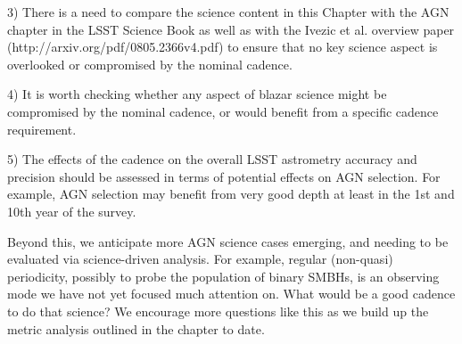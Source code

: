 3) There is a need to compare the science content in this Chapter
with the AGN chapter in the LSST Science Book as well as with the
Ivezic et al. overview paper (http://arxiv.org/pdf/0805.2366v4.pdf)
to ensure that no key science aspect is overlooked or compromised
by the nominal cadence.






4) It is worth checking whether
any aspect of blazar science might be compromised by the nominal cadence, or
would benefit from a specific cadence requirement.

5) The effects of the cadence on the overall LSST astrometry accuracy and precision
should be assessed in terms of potential effects on AGN selection. For example,
AGN selection may benefit from very good depth at least in the 1st and 10th year of the
survey.


Beyond this, we anticipate more AGN science cases emerging, and needing to be evaluated via science-driven \MAF analysis. For example, regular (non-quasi) periodicity, possibly to probe the population of binary SMBHs, is an observing mode we have not yet focused much attention on.  What would be a good cadence to do that science? We encourage more questions like this as we build up the metric analysis outlined in the chapter to date.

\navigationbar
